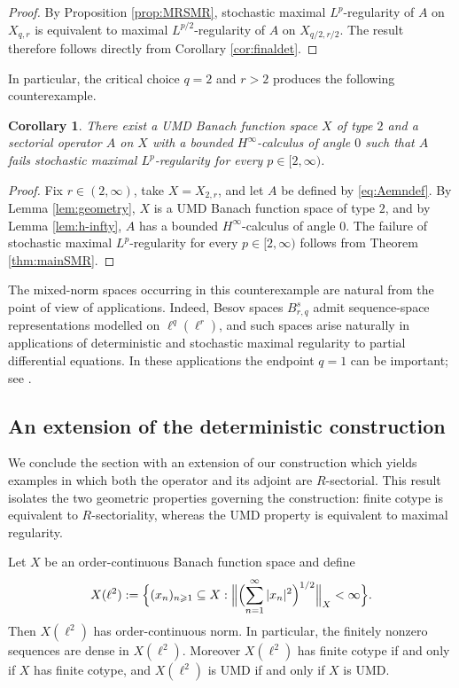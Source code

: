 \documentclass{amsart}
\let\geq\geqslant
\theoremstyle{plain}
\theoremstyle{remark}
\theoremstyle{plain}
\newtheorem{corollary}[theorem]{Corollary}
\numberwithin{equation}{section}
\newcommand{\1}{\mathbf 1}
\newcommand{\nrmB}[1]{\Bigl\|#1\Bigr\|}
\newcommand{\brB}[1]{\Bigl(#1\Bigr)}
\newcommand{\cbraceB}[1]{\Bigl\{#1\Bigr\}}
\begin{document}
\begin{proof}
By Proposition \ref{prop:MRSMR}, stochastic maximal $L^p$-regularity of $A$ on $X_{q,r}$ is equivalent to maximal $L^{p/2}$-regularity of $A$ on $X_{q/2,r/2}$. The result therefore
follows directly from Corollary \ref{cor:finaldet}.
\end{proof}

In particular, the critical choice $q=2$ and $r>2$ produces the following counterexample.

\begin{corollary}\label{cor:main}
There exist a UMD Banach function space $X$ of type $2$ and a sectorial operator $A$ on $X$ with a bounded $H^\infty$-calculus of angle $0$ such that $A$ fails stochastic maximal $L^p$-regularity for every $p\in[2,\infty)$.
\end{corollary}

\begin{proof}
Fix $r\in(2,\infty)$, take $X=X_{2,r}$, and let $A$ be defined by \eqref{eq:Aemndef}. By Lemma \ref{lem:geometry}, $X$ is a UMD Banach function space of type $2$, and by Lemma \ref{lem:h-infty}, $A$ has a bounded $H^\infty$-calculus of angle $0$. The failure of stochastic maximal $L^p$-regularity for every $p\in[2,\infty)$ follows from Theorem \ref{thm:mainSMR}.
\end{proof}

The mixed-norm spaces occurring in this counterexample are  natural from the point of view of applications. Indeed, Besov spaces $B^s_{r,q}$ admit sequence-space representations modelled on $\ell^q(\ell^r)$, and such spaces arise naturally in applications of deterministic and stochastic maximal regularity to partial differential equations. In these applications the endpoint $q=1$ can be important; see \cite{agresti2023primitive,DHMPT,OgSh}.


\subsection{An extension of the deterministic construction}
\label{ss:further-deterministic}

We conclude the section with  an extension of our construction which yields examples in which both the operator and its adjoint are $R$-sectorial. This result isolates the two geometric
properties governing the construction: finite cotype is equivalent to
$R$-sectoriality, whereas the UMD property is equivalent to maximal
regularity.

Let $X$ be an order-continuous Banach function space and define
\[
        X(\ell^2):=\cbraceB{(x_n)_{n\geq1}\subseteq X:\nrmB{\brB{\sum_{n=1}^\infty |x_n|^2}^{1/2}}_X<\infty}.
\]
Then $X(\ell^2)$ has order-continuous norm. In particular, the
finitely nonzero sequences are dense in $X(\ell^2)$. Moreover $X(\ell^2)$ has finite cotype if and only if $X$ has finite cotype, and $X(\ell^2)$ is UMD if and only if $X$ is UMD.
\end{document}
